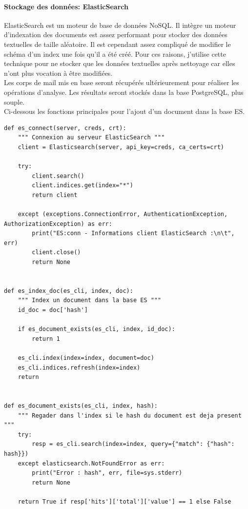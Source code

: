 \documentclass[a4paper,12pt]{article}
\begin{document}
			\paragraph{Stockage des données: ElasticSearch}
				ElasticSearch est un moteur de base de données NoSQL. Il intègre un moteur d'indexation des documents est assez performant pour stocker des données textuelles de taille aléatoire. 
				Il est cependant assez compliqué de modifier le schéma d'un index une fois qu'il a été créé. Pour ces raisons, j'utilise cette technique pour ne stocker que les données textuelles après nettoyage car elles n'ont plus vocation à être modifiées. \\
				
				Les corps de mail mis en base seront récupérés ultérieurement pour réaliser les opérations d'analyse. Les résultats seront stockés dans la base PostgreSQL, plus souple. \\
				
				Ci-dessous les fonctions principales pour l'ajout d'un document dans la base ES.
				\begin{lstlisting}[title=Fonctions basique pour la liaison ElasticSearch]
def es_connect(server, creds, crt):
    """ Connexion au serveur ElasticSearch """
    client = Elasticsearch(server, api_key=creds, ca_certs=crt)

    try:
        client.search()
        client.indices.get(index="*")
        return client

    except (exceptions.ConnectionError, AuthenticationException, AuthorizationException) as err:
        print("ES:conn - Informations client ElasticSearch :\n\t", err)
        client.close()
        return None
        

def es_index_doc(es_cli, index, doc):
    """ Index un document dans la base ES """
    id_doc = doc['hash']

    if es_document_exists(es_cli, index, id_doc):
        return 1

    es_cli.index(index=index, document=doc)
    es_cli.indices.refresh(index=index)
    return 


def es_document_exists(es_cli, index, hash):
    """ Regader dans l'index si le hash du document est deja present """
    try:
        resp = es_cli.search(index=index, query={"match": {"hash": hash}})
    except elasticsearch.NotFoundError as err:
        print("Error : hash", err, file=sys.stderr)
        return None

    return True if resp['hits']['total']['value'] == 1 else False
				\end{lstlisting}
				
\end{document}
